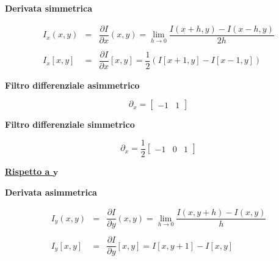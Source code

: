 \documentclass[a4paper]{article}
\begin{document}
	\noindent
	\textcolor{Green4}{\textbf{Derivata simmetrica}}
	
	\begin{equation*}
		\begin{array}{lll}
			I_{x}\left(x,y\right) & = & \dfrac{\partial I}{\partial x}\left(x,y\right) = \lim_{h \rightarrow 0} \dfrac{I\left(x+h, y\right) - I\left(x-h,y\right)}{2h} \\
			&& \\
			I_{x}\left[x,y\right] & = & \dfrac{\partial I}{\partial x}\left[x,y\right] = \dfrac{1}{2} \left(I\left[x+1, y\right] - I\left[x-1,y\right]\right)
		\end{array}
	\end{equation*}

	\noindent
	\textcolor{Green4}{\textbf{Filtro differenziale asimmetrico}}
	
	\begin{equation*}
		\partial_{x} = \begin{bmatrix}
			-1 & 1
		\end{bmatrix}
	\end{equation*}

	\noindent
	\textcolor{Green4}{\textbf{Filtro differenziale simmetrico}}
	
	\begin{equation*}
		\partial_{x} = \dfrac{1}{2} \begin{bmatrix}
			-1 & 0 & 1
		\end{bmatrix}
	\end{equation*}

	\newpage

	\begin{center}
		\textcolor{Red3}{\textbf{\underline{Rispetto a $\boldsymbol{y}$}}}
	\end{center}

	\noindent
	\textcolor{Green4}{\textbf{Derivata asimmetrica}}
	
	\begin{equation*}
		\begin{array}{lll}
			I_{y}\left(x,y\right) & = & \dfrac{\partial I}{\partial y}\left(x,y\right) = \lim_{h \rightarrow 0} \dfrac{I\left(x, y+h\right) - I\left(x,y\right)}{h} \\
			&& \\
			I_{y}\left[x,y\right] & = & \dfrac{\partial I}{\partial y}\left[x,y\right] = I\left[x, y+1\right] - I\left[x,y\right]
		\end{array}
	\end{equation*}
\end{document}
